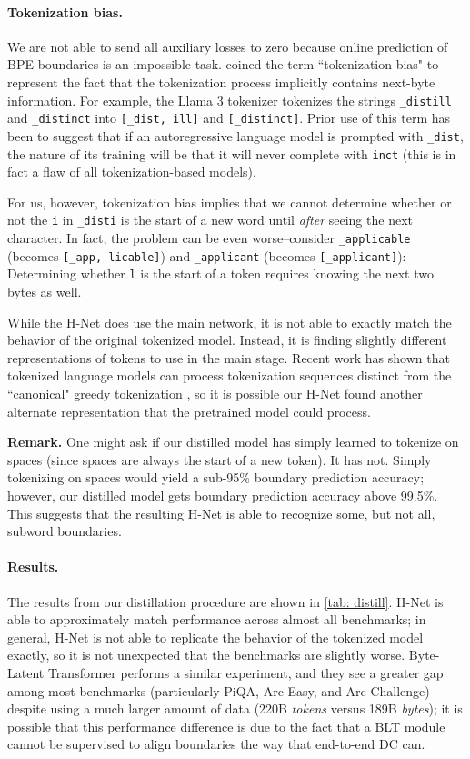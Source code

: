 \documentclass{article}
\newcommand{\citep}{\parencite}
\newcommand{\citet}{\textcite}
\newcommand{\model}{H-Net}
\newcommand{\main}{main network}
\theoremstyle{plain}
\theoremstyle{remark}
\begin{document}
\paragraph{Tokenization bias.} We are not able to send all auxiliary losses to zero because online prediction of BPE boundaries is an impossible task.
\citet{phan2025exact} coined the term ``tokenization bias" to represent the fact that the tokenization process implicitly contains next-byte information.
For example, the Llama 3 tokenizer tokenizes the strings \texttt{\_distill} and \texttt{\_distinct} into \texttt{[\_dist, ill]} and \texttt{[\_distinct]}.
Prior use of this term has been to suggest that if an autoregressive language model is prompted with \texttt{\_dist}, the nature of its training will be that it will never complete with \texttt{inct} (this is in fact a flaw of all tokenization-based models).

For us, however, tokenization bias implies that we cannot determine whether or not the \texttt{i} in \texttt{\_disti} is the start of a new word until \emph{after} seeing the next character.
In fact, the problem can be even worse--consider \texttt{\_applicable} (becomes \texttt{[\_app, licable]}) and \texttt{\_applicant} (becomes \texttt{[\_applicant]}): Determining whether \texttt{l} is the start of a token requires knowing the next two bytes as well.

While the \model{} does use the \main{}, it is not able to exactly match the behavior of the original tokenized model.
Instead, it is finding slightly different representations of tokens to use in the main stage. 
Recent work has shown that tokenized language models can process tokenization sequences distinct from the ``canonical" greedy tokenization \citep{vieira2024language}, so it is possible our \model{} found another alternate representation that the pretrained model could process.

\textbf{Remark.} One might ask if our distilled model has simply learned to tokenize on spaces (since spaces are always the start of a new token). It has not. Simply tokenizing on spaces would yield a sub-95\% boundary prediction accuracy; however, our distilled model gets boundary prediction accuracy above 99.5\%. This suggests that the resulting \model{} is able to recognize some, but not all, subword boundaries.

\paragraph{Results.} The results from our distillation procedure are shown in \cref{tab: distill}. 
H-Net is able to approximately match performance across almost all benchmarks; in general, H-Net is not able to replicate the behavior of the tokenized model exactly, so it is not unexpected that the benchmarks are slightly worse.
Byte-Latent Transformer \citep[Table 5]{BLT} performs a similar experiment, and they see a greater gap among most benchmarks (particularly PiQA, Arc-Easy, and Arc-Challenge) despite using a much larger amount of data (220B \emph{tokens} versus 189B \emph{bytes});
it is possible that this performance difference is due to the fact that a BLT module cannot be supervised to align boundaries the way that end-to-end DC can.
\end{document}
